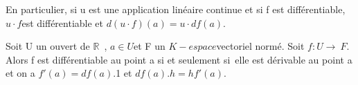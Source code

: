 %
\begin{example}[Remarque]
  En particulier, si u est une application linéaire
  continue et si f est différentiable,$ u \cdot f $est différentiable et
  $d(u \cdot
  f)(a) = u \cdot df(a).$
%
\end{example}
%
%
\begin{thm}
  Soit U un ouvert de $\mathbb{R}$~, $a \in U $et F un $K-espace $vectoriel
  normé. Soit $f : U \rightarrow~ F$. Alors f est différentiable au point a si et
  seulement si~elle est dérivable au point a et on a $f'(a) = df(a).$1 et
  $df(a).h = hf'(a)$.

\end{thm}

